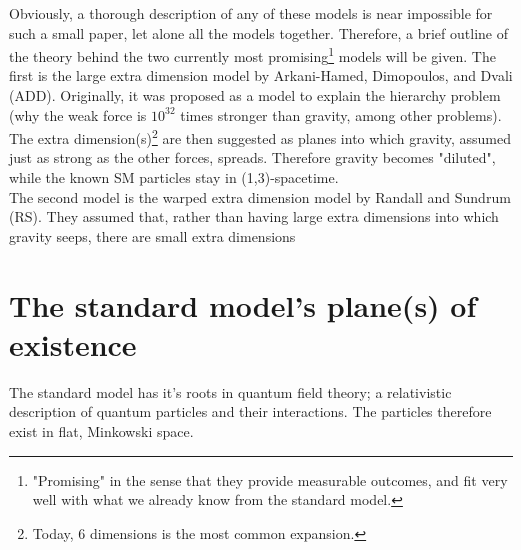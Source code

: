 \documentclass[11pt,a4paper]{article}
\begin{document}
Obviously, a thorough description of any of these models is near impossible for such a small paper, let alone all the models together. Therefore, a brief outline of the theory behind the two currently most promising\footnote{"Promising" in the sense that they provide measurable outcomes, and fit very well with what we already know from the standard model.} models will be given. The first is the large extra dimension model by Arkani-Hamed, Dimopoulos, and Dvali (ADD). Originally, it was proposed as a model to explain the hierarchy problem (why the weak force is $10^{32}$ times stronger than gravity, among other problems). The extra dimension(s)\footnote{Today, 6 dimensions is the most common expansion.} are then suggested as planes into which gravity, assumed just as strong as the other forces, spreads. Therefore gravity becomes "diluted", while the known SM particles stay in (1,3)-spacetime.\\
The second model is the warped extra dimension model by Randall and Sundrum (RS). They assumed that, rather than having large extra dimensions into which gravity seeps,  there are small extra dimensions

\section{The standard model's plane(s) of existence}
The standard model has it's roots in quantum field theory; a relativistic description of quantum particles and their interactions. The particles therefore exist in flat, Minkowski space.
\end{document}
